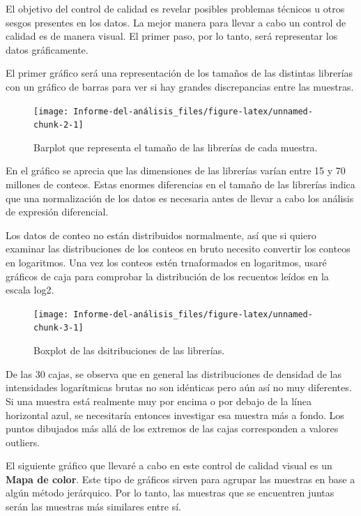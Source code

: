 \documentclass[]{article}
\begin{document}
El objetivo del control de calidad es revelar posibles problemas
técnicos u otros sesgos presentes en los datos. La mejor manera para
llevar a cabo un control de calidad es de manera visual. El primer paso,
por lo tanto, será representar los datos gráficamente.

El primer gráfico será una representación de los tamaños de las
distintas librerías con un gráfico de barras para ver si hay grandes
discrepancias entre las muestras.

\begin{figure}[H]

{\centering \texttt{[image: Informe-del-análisis\_files/figure-latex/unnamed-chunk-2-1]} 

}

\caption{Barplot que representa el tamaño de las librerías de cada muestra.}\label{fig:unnamed-chunk-2}
\end{figure}

En el gráfico se aprecia que las dimensiones de las librerías varían
entre 15 y 70 millones de conteos. Estas enormes diferencias en el
tamaño de las librerías indica que una normalización de los datos es
necesaria antes de llevar a cabo los análisis de expresión diferencial.

Los datos de conteo no están distribuidos normalmente, así que si quiero
examinar las distribuciones de los conteos en bruto necesito convertir
los conteos en logaritmos. Una vez los conteos estén trnaformados en
logaritmos, usaré gráficos de caja para comprobar la distribución de los
recuentos leídos en la escala log2.

\begin{figure}[H]

{\centering \texttt{[image: Informe-del-análisis\_files/figure-latex/unnamed-chunk-3-1]} 

}

\caption{Boxplot de las dsitribuciones de las librerías.}\label{fig:unnamed-chunk-3}
\end{figure}

De las 30 cajas, se observa que en general las distribuciones de
densidad de las intensidades logarítmicas brutas no son idénticas pero
aún así no muy diferentes. Si una muestra está realmente muy por encima
o por debajo de la línea horizontal azul, se necesitaría entonces
investigar esa muestra más a fondo. Los puntos dibujados más allá de los
extremos de las cajas corresponden a valores outliers.

El siguiente gráfico que llevaré a cabo en este control de calidad
visual es un \textbf{Mapa de color}. Este tipo de gráficos sirven para
agrupar las muestras en base a algún método jerárquico. Por lo tanto,
las muestras que se encuentren juntas serán las muestras más similares
entre sí.
\end{document}
